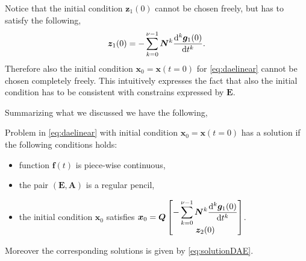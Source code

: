 		\begin{remark}
			Notice that the initial condition $\bm{z}_{1}(0)$
			cannot be chosen freely, but has to satisfy the following,
			\begin{equation}
				\bm{z}_{1}(0) = -\sum_{k=0}^{\nu-1}\bm{N}^{k}\frac{\mathop{}\!\mathrm{d}^{k}\bm{g}_{1}(0)}{\mathop{}\!\mathrm{d} t^{k}}.
			\end{equation}
			Therefore also the initial condition $\bm{x}_{0}=\bm{x}(t=0)$
			for \cref{eq:daelinear} cannot be chosen completely freely.
			This intuitively expresses the fact that also the initial
			condition has to be consistent with constrains expressed by $\bm{E}$.
		\end{remark}
		Summarizing what we discussed we have the following,
		\begin{theorem}
			Problem in \cref{eq:daelinear} with initial condition 
			$\bm{x}_{0} = \bm{x}(t=0)$ has a solution if the following conditions holds:
			\begin{itemize}
				\item function $\bm{f}(t)$ is piece-wise continuous,
				\item the pair $(\bm{E,A})$ is a regular pencil,
				\item the initial condition $\bm{x}_{0}$ satisfies 
				$\bm{x}_{0} = \bm{Q}\begin{bmatrix} -\displaystyle\sum_{k=0}^{\nu-1}\bm{N}^{k}
				\dfrac{\mathop{}\!\mathrm{d}^{k} \bm{g}_{1}(0)}{\mathop{}\!\mathrm{d} t^{k}} \\ 
				\bm{z}_{2}(0) \end{bmatrix}$.
			\end{itemize}
			Moreover the corresponding solutions is given by \cref{eq:solutionDAE}.
		\end{theorem}
